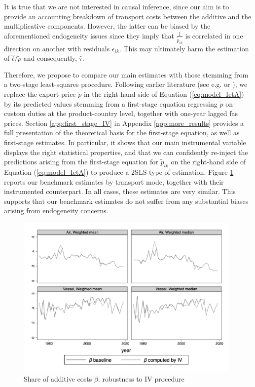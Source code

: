 \documentclass[a4paper,11pt]{article}
\begin{document}
It is true that we are not interested in causal inference, since our aim is to provide an accounting breakdown of transport costs between the additive and the multiplicative components. However, the latter can be biased by the aforementioned endogeneity issues since they imply that $\frac{1}{\widetilde{p}_{ik}}$ is correlated in one direction on another with residuals $\epsilon_{ik}$. This may ultimately harm the estimation of $\widehat{t}/\widetilde{p}$ and consequently, $\widehat{\tau}$.

Therefore, we propose to compare our main estimates with those stemming from a two-stage least-squares procedure. Following earlier literature (see e.g. \citealp{Caliendo_Parro_2015} or \citealp{Lashkaripour-2017}), we replace the export price $\widetilde{p}$ in the right-hand side of Equation (\ref{eq:model_IetA}) by its predicted values stemming from a first-stage equation regressing $\widetilde{p}$ on custom duties at the product-country level, together with one-year lagged fas prices. Section \ref{app:first_stage_IV} in Appendix \ref{app:more_results} provides a full presentation of the theoretical basis for the first-stage equation, as well as first-stage estimates. In particular, it shows that our main instrumental variable displays the right statistical properties, and that we can confidently re-inject the predictions arising from the first-stage equation for $\widetilde{p}_{ik}$ on the right-hand side of Equation (\ref{eq:model_IetA}) %
 to produce a 2SLS-type of estimation. Figure \ref{fig:comp_IV_SITC5} reports our benchmark estimates by transport mode, together with their instrumented counterpart. In all cases, these estimates are very similar. This supports that our benchmark estimates do not suffer from any substantial biases arising from endogeneity concerns.

\begin{figure}[htbp]
\caption{Share of additive costs $\beta$: robustness to IV procedure}
\label{fig:comp_IV_SITC5}
\begin{center}
\includegraphics[height=8cm]
{scatter_chronology_baseline_IV_ref1_y_5_3.png}
\end{center}
\end{figure}
\end{document}
